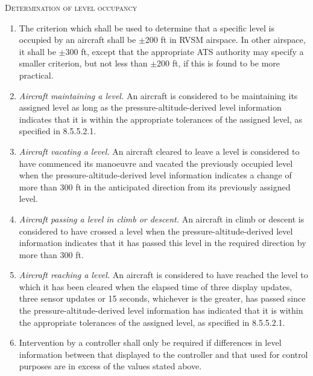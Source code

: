 \documentclass[../vATM.tex]{subfiles}
\begin{document}
\begin{enumeratesc}
        \item \textsc{Determination of level occupancy}
        \begin{enumerate}
            \item The criterion which shall be used to determine that a specific level is occupied by an aircraft shall be $\pm$200 ft in RVSM airspace. In other airspace, it shall be $\pm$300 ft, except that the appropriate ATS authority may specify a smaller criterion, but not less than $\pm$200 ft, if this is found to be more practical.
            \item \textit{Aircraft maintaining a level.} An aircraft is considered to be maintaining its assigned level as long as the pressure-altitude-derived level information indicates that it is within the appropriate tolerances of the assigned level, as specified in 8.5.5.2.1.
            \item \textit{Aircraft vacating a level.} An aircraft cleared to leave a level is considered to have commenced its manoeuvre and vacated the previously occupied level when the pressure-altitude-derived level information indicates a change of more than 300 ft in the anticipated direction from its previously assigned level.
            \item \textit{Aircraft passing a level in climb or descent.} An aircraft in climb or descent is considered to have crossed a level when the pressure-altitude-derived level information indicates that it has passed this level in the required direction by more than 300 ft.
            \item \textit{Aircraft reaching a level.} An aircraft is considered to have reached the level to which it has been cleared when the elapsed time of three display updates, three sensor updates or 15 seconds, whichever is the greater, has passed since the pressure-altitude-derived level information has indicated that it is within the appropriate tolerances of the assigned level, as specified in 8.5.5.2.1.
            \item Intervention by a controller shall only be required if differences in level information between that displayed to the controller and that used for control purposes are in excess of the values stated above.
        \end{enumerate}
    \end{enumeratesc}
\end{document}
